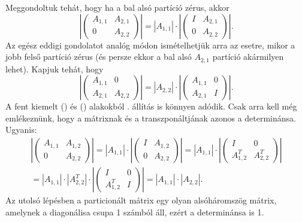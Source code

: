 \documentclass[a4paper, showtrims]{memoir}
\theoremstyle{plain}
\theoremstyle{remark}
\theoremstyle{definition}
\begin{document}
Meggondoltuk tehát, hogy ha a bal alsó partíció zérus, akkor
\[
    \left|
    \begin{pmatrix}
        A_{1,1}&A_{2,1}\\
        0&A_{2,2}
    \end{pmatrix}
    \right|
    =
    |A_{1,1}|\cdot
    \left|
    \begin{pmatrix}
        I&A_{2,1}\\
        0&A_{2,2}
    \end{pmatrix}
    \right|.\tag{\dag}
\]
Az egész eddigi gondolatot analóg módon ismételhetjük arra az esetre, 
mikor a jobb felső partíció zérus (és persze ekkor a bal alsó $A_{2,1}$ partíció akármilyen lehet).
Kapjuk tehát, hogy
\[
    \left|
    \begin{pmatrix}
        A_{1,1}&0\\
        A_{2,1}&A_{2,2}
    \end{pmatrix}
    \right|
    =
    |A_{2,2}|\cdot
    \left|
    \begin{pmatrix}
        A_{1,1}&0\\
        A_{2,1}&I
    \end{pmatrix}
    \right|.\tag{\ddag}
\]
A fent kiemelt (\dag) és (\ddag) alakokból . állítás is könnyen adódik.
Csak arra kell még emlékeznünk, hogy a mátrixnak és a transzponáltjának azonos a determinánsa.
Ugyanis:
\begin{multline*}
    \left|
    \begin{pmatrix}
        A_{1,1}&A_{1,2}\\
        0&A_{2,2}
    \end{pmatrix}
    \right|
    =
    |A_{1,1}|\cdot
    \left|
    \begin{pmatrix}
        I&A_{1,2}\\
        0&A_{2,2}
    \end{pmatrix}
    \right|
    =
    |A_{1,1}|\cdot
    \left|
    \begin{pmatrix}
        I&0\\
        A_{1,2}^T&A_{2,2}^T
    \end{pmatrix}
    \right|
    \\
    =
    |A_{1,1}|\cdot |A_{2,2}^T|\cdot
    \left|
    \begin{pmatrix}
        I&0\\
        A_{1,2}^T&I
    \end{pmatrix}
    \right|
    =
    |A_{1,1}|\cdot |A_{2,2}|.
\end{multline*}
Az utolsó lépésben a particionált mátrix egy olyan alsóháromszög mátrix, amelynek a diagonálisa csupa 1 számból áll, ezért a determinánsa is 1.
\end{document}

